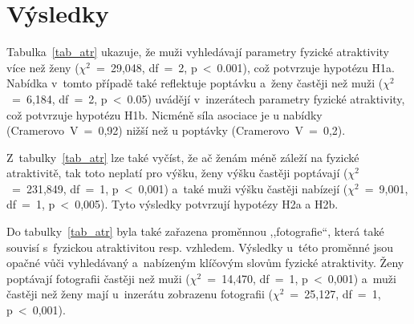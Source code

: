 \documentclass[a4paper, 12pt, notitlepage, oneside, numbers=noenddot]{report}
\begin{document}
\section{Výsledky}


Tabulka~\ref{tab_atr} ukazuje, že muži vyhledávají parametry fyzické
atraktivity více než ženy ($\chi^2$~=~29,048, df~=~2,
p~{\textless}~0.001), což potvrzuje hypotézu H1a. Nabídka v~tomto
případě také reflektuje poptávku a~ženy častěji než muži
($\chi^2$~=~6,184, df~=~2, p~{\textless}~0.05) uvádějí v~inzerátech
parametry fyzické atraktivity, což potvrzuje hypotézu H1b. Nicméně
síla asociace je u nabídky (Cramerovo~V~=~0,92) nižší než u poptávky
(Cramerovo~V~=~0,2).

Z~tabulky~\ref{tab_atr} lze také vyčíst, že ač ženám méně záleží na
fyzické atraktivitě, tak toto neplatí pro výšku, ženy výšku častěji
poptávají ($\chi^2$~=~231,849, df~=~1, p~{\textless}~0,001) a~také
muži výšku častěji nabízejí ($\chi^2$~=~9,001, df~=~1,
p~{\textless}~0,005).  Tyto výsledky potvrzují hypotézy H2a a H2b.

Do tabulky~\ref{tab_atr} byla také zařazena proměnnou ,,fotografie``,
která také souvisí s~fyzickou atraktivitou resp. vzhledem. Výsledky
u~této proměnné jsou opačné vůči vyhledávaný a~nabízeným klíčovým
slovům fyzické atraktivity.  Ženy poptávají fotografii častěji než
muži ($\chi^2$~=~14,470, df~=~1, p~{\textless}~0,001) a~muži častěji
než ženy mají u~inzerátu zobrazenu fotografii ($\chi^2$~=~25,127,
df~=~1, p~{\textless}~0,001).
\end{document}

